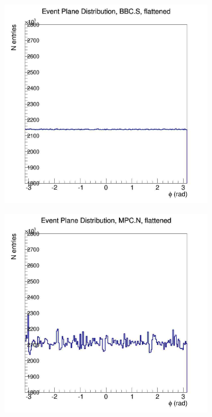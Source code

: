 \begin{figure}
\begin{subfigure}[p]{0.4\textwidth}
    \includegraphics[width=1\textwidth]{EPflattening/flatbbcs.jpg}
    \end{subfigure}
    \begin{subfigure}[p]{0.4\textwidth}
    \includegraphics[width=1\textwidth]{EPflattening/flatmpcn.jpg}

\end{subfigure}
\end{figure}
